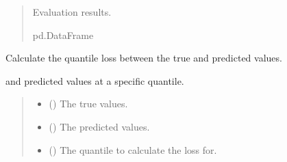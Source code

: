\documentclass[letterpaper,10pt,english]{sphinxmanual}
\begin{document}
\begin{fulllineitems}
\begin{quote}
\begin{description}
\begin{itemize}
\end{itemize}

\sphinxAtStartPar
Evaluation results.

\sphinxAtStartPar
pd.DataFrame

\end{description}\end{quote}

\end{fulllineitems}


\begin{fulllineitems}
\label{\detokenize{src_demand_forecast.models:src_demand_forecast.models.repro_experiments.quantile_loss}}
\pysigstartsignatures
{}
\pysigstopsignatures
\sphinxAtStartPar
Calculate the quantile loss between the true and predicted values.
\begin{description}
\sphinxAtStartPar
and predicted values at a specific quantile.

\end{description}
\begin{quote}\begin{description}
\begin{itemize}
\item {} 
\sphinxAtStartPar
{} () \textendash{} The true values.

\item {} 
\sphinxAtStartPar
{} () \textendash{} The predicted values.

\item {} 
\sphinxAtStartPar
{} () \textendash{} The quantile to calculate the loss for.


\end{itemize}
\end{description}
\end{quote}
\end{fulllineitems}
\end{document}
